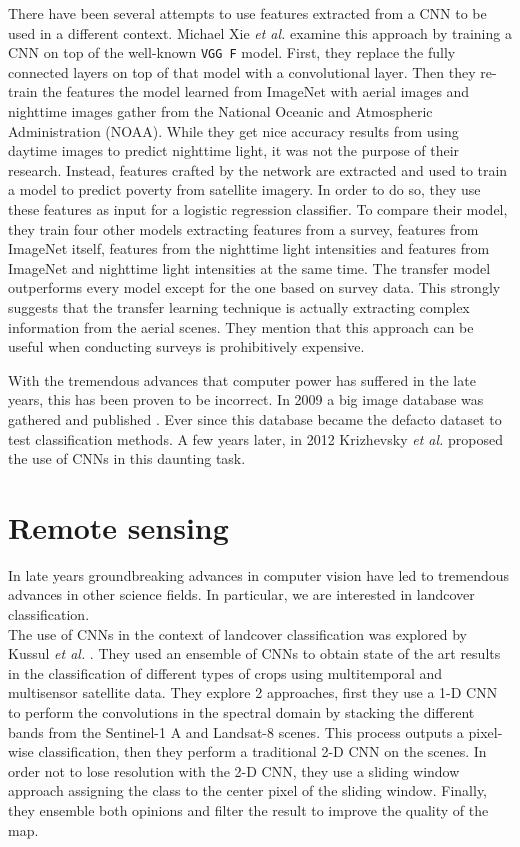 There have been several attempts to use features extracted from a CNN to be used in a different context. Michael Xie \textit{et al.} \cite{DBLP:journals/corr/XieJBLE15} examine this approach by training a CNN on top of the well-known \texttt{VGG F} model. First, they replace the fully connected layers on top of that model with a convolutional layer. Then they re-train the features the model learned from ImageNet with aerial images and nighttime images gather from the National Oceanic and Atmospheric Administration (NOAA). While they get nice accuracy results from using daytime images to predict nighttime light, it was not the purpose of their research. Instead, features crafted by the network are extracted and used to train a model to predict poverty from satellite imagery. In order to do so, they use these features as input for a logistic regression classifier. To compare their model, they train four other models extracting features from a survey, features from ImageNet itself, features from the nighttime light intensities and features from ImageNet and nighttime light intensities at the same time. The transfer model outperforms every model except for the one based on survey data. This strongly suggests that the transfer learning technique is actually extracting complex information from the aerial scenes. They mention that this approach can be useful when conducting surveys is prohibitively expensive.

With the tremendous advances that computer power has suffered in the late years, this has been proven to be incorrect. In 2009 a big image database was gathered and published \cite{Deng09imagenet:a}. Ever since this database became the defacto dataset to test classification methods. A few years later, in 2012 Krizhevsky \textit{et al.} \cite{krizhevsky} proposed the use of CNNs in this daunting task.\\

\section{Remote sensing}

In late years groundbreaking advances in computer vision have led to tremendous advances in other science fields. In particular, we are interested in landcover classification.\\

The use of CNNs in the context of landcover classification was explored by Kussul \textit{et al.} \cite{7891032}. They used an ensemble of CNNs to obtain state of the art results in the classification of different types of crops using multitemporal and multisensor satellite data. They explore 2 approaches, first they use a 1-D CNN to perform the convolutions in the spectral domain by stacking the different bands from the Sentinel-1 A and Landsat-8 scenes. This process outputs a pixel-wise classification, then they perform a traditional 2-D CNN on the scenes. In order not to lose resolution with the 2-D CNN, they use a sliding window approach assigning the class to the center pixel of the sliding window. Finally, they ensemble both opinions and filter the result to improve the quality of the map.

